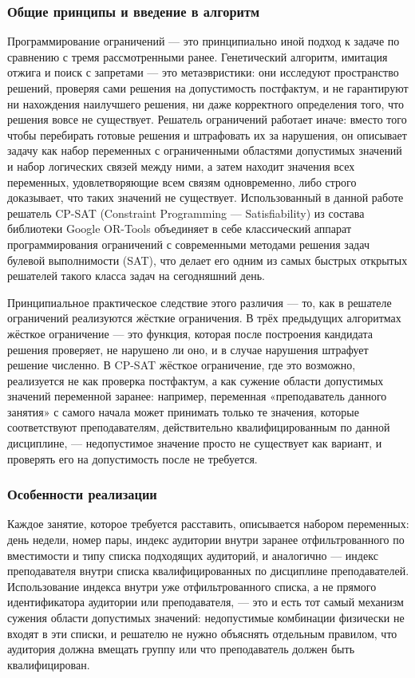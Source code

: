  
\subsubsection { Общие принципы и введение в алгоритм}

Программирование ограничений — это принципиально иной подход к задаче по сравнению с тремя рассмотренными ранее. Генетический алгоритм, имитация отжига и поиск с запретами — это метаэвристики: они исследуют пространство решений, проверяя сами решения на допустимость постфактум, и не гарантируют ни нахождения наилучшего решения, ни даже корректного определения того, что решения вовсе не существует. Решатель ограничений работает иначе: вместо того чтобы перебирать готовые решения и штрафовать их за нарушения, он описывает задачу как набор переменных с ограниченными областями допустимых значений и набор логических связей между ними, а затем находит значения всех переменных, удовлетворяющие всем связям одновременно, либо строго доказывает, что таких значений не существует. Использованный в данной работе решатель CP-SAT (Constraint Programming — Satisfiability) из состава библиотеки Google OR-Tools объединяет в себе классический аппарат программирования ограничений с современными методами решения задач булевой выполнимости (SAT), что делает его одним из самых быстрых открытых решателей такого класса задач на сегодняшний день.

Принципиальное практическое следствие этого различия — то, как в решателе ограничений реализуются жёсткие ограничения. В трёх предыдущих алгоритмах жёсткое ограничение — это функция, которая после построения кандидата решения проверяет, не нарушено ли оно, и в случае нарушения штрафует решение численно. В CP-SAT жёсткое ограничение, где это возможно, реализуется не как проверка постфактум, а как сужение области допустимых значений переменной заранее: например, переменная «преподаватель данного занятия» с самого начала может принимать только те значения, которые соответствуют преподавателям, действительно квалифицированным по данной дисциплине, — недопустимое значение просто не существует как вариант, и проверять его на допустимость после не требуется.

\subsubsection { Особенности реализации}

Каждое занятие, которое требуется расставить, описывается набором переменных: день недели, номер пары, индекс аудитории внутри заранее отфильтрованного по вместимости и типу списка подходящих аудиторий, и аналогично — индекс преподавателя внутри списка квалифицированных по дисциплине преподавателей. Использование индекса внутри уже отфильтрованного списка, а не прямого идентификатора аудитории или преподавателя, — это и есть тот самый механизм сужения области допустимых значений: недопустимые комбинации физически не входят в эти списки, и решателю не нужно объяснять отдельным правилом, что аудитория должна вмещать группу или что преподаватель должен быть квалифицирован.

